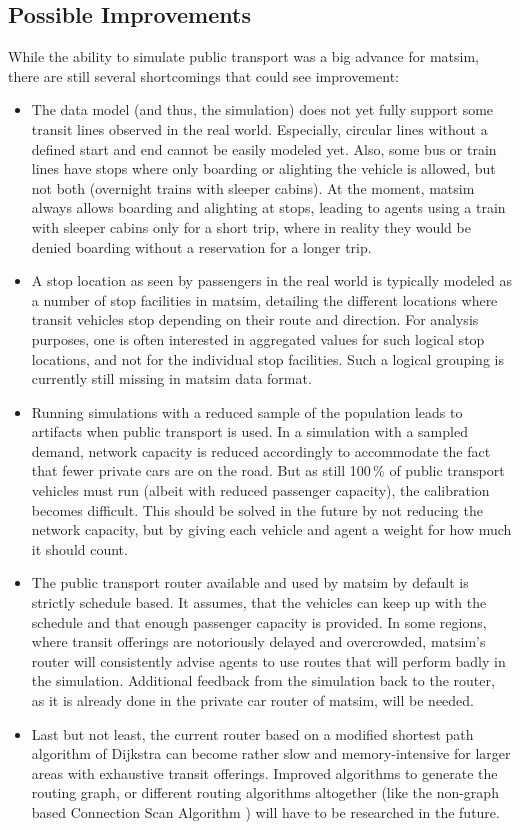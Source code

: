 \subsection{Possible Improvements}
While the ability to simulate public transport was a big advance for \gls{matsim},
there are still several shortcomings that could see improvement:
%
\begin{itemize}\styleItemize
	\item The data model (and thus, the simulation) does not yet fully support some
	transit lines observed in the real world. Especially, circular lines without a
	defined start and end cannot be easily modeled yet. Also, some bus or
	train lines have stops where only boarding or alighting the vehicle is allowed,
	but not both (\eg overnight trains with sleeper cabins). At the moment, \gls{matsim}
	always allows boarding and alighting at stops, leading to agents \eg using a
	train with sleeper cabins only for a short trip, where in reality they would be
	denied boarding without a reservation for a longer trip.
	\item A stop location as seen by passengers in the real world is
	typically modeled as a number of stop facilities in \gls{matsim}, detailing the
	different locations where transit vehicles stop depending on their route and
	direction. For analysis purposes, one is often interested in aggregated values
	for such logical stop locations, and not for the individual stop facilities.
	Such a logical grouping is currently still missing in \gls{matsim} data format.
	\item Running simulations with a reduced sample of the population leads to
	artifacts when public transport is used. In a simulation with a sampled demand,
	network capacity is reduced accordingly to accommodate the fact that fewer
	private cars are on the road. But as still 100\,\% of public transport vehicles
	must run (albeit with reduced passenger capacity), the calibration becomes
	difficult. This should be solved in the future by not reducing the network
	capacity, but by giving each vehicle and agent a weight for how much it should
	count.
	\item The public transport router available and used by \gls{matsim} by default is
	strictly schedule based. It assumes, that the vehicles can keep up with the
	schedule and that enough passenger capacity is provided. In some regions, where
	transit offerings are notoriously delayed and overcrowded, \gls{matsim}'s router will
	consistently advise agents to use routes that will perform badly in the
	simulation. Additional feedback from the simulation back to the router, as it
	is already done in the private car router of \gls{matsim}, will be needed.
	\item Last but not least, the current router based on a modified shortest path
	algorithm of Dijkstra can become rather slow and memory-intensive for
	larger areas with exhaustive transit offerings. Improved algorithms to generate
	the routing graph, or different routing algorithms altogether (like the
	non-graph based Connection Scan Algorithm
	\citep{DibbeltEtAl_BonifaciEtAl_2013}) will have to be researched in the
	future.
\end{itemize}

